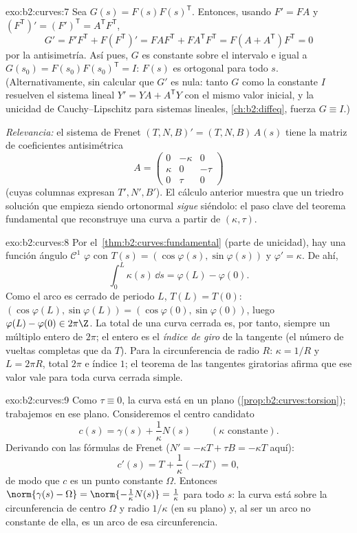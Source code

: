 \begin{solution}{exo:b2:curves:7}
Sea $G(s) = F(s)F(s)^{\mathsf T}$. Entonces, usando $F' = FA$ y
$(F^{\mathsf T})' = (F')^{\mathsf T} = A^{\mathsf T}F^{\mathsf T}$,
\[
G' = F'F^{\mathsf T} + F(F^{\mathsf T})'
= FAF^{\mathsf T} + FA^{\mathsf T}F^{\mathsf T}
= F(A + A^{\mathsf T})F^{\mathsf T} = 0
\]
por la antisimetría. Así pues, $G$ es constante sobre el intervalo e
igual a $G(s_0) = F(s_0)F(s_0)^{\mathsf T} = I$: $F(s)$ es ortogonal
para todo $s$. (Alternativamente, sin calcular que $G'$ es nula:
tanto $G$ como la constante $I$ resuelven el sistema lineal $Y' = YA
+ A^{\mathsf T}Y$ con el mismo valor inicial, y la unicidad de
Cauchy--Lipschitz para sistemas lineales, \cref{ch:b2:diffeq},
fuerza $G \equiv I$.)

\emph{Relevancia:} el sistema de Frenet $(T, N, B)' = (T, N,
B)\,A(s)$ tiene la matriz de coeficientes antisimétrica
\[
A = \begin{pmatrix} 0 & -\kappa & 0\\ \kappa & 0 & -\tau\\
0 & \tau & 0\end{pmatrix}
\]
(cuyas columnas expresan $T', N', B'$). El cálculo anterior muestra
que un triedro solución que empieza siendo ortonormal \emph{sigue}
siéndolo: el paso clave del teorema fundamental que reconstruye una
curva a partir de $(\kappa, \tau)$.
\end{solution}

\begin{solution}{exo:b2:curves:8}
Por el~\cref{thm:b2:curves:fundamental} (parte de unicidad), hay una
función ángulo $\mathcal{C}^1$ $\varphi$ con $T(s) =
(\cos\varphi(s), \sin\varphi(s))$ y $\varphi' = \kappa$. De ahí,
\[
\int_0^L \kappa(s)\,\dd s = \varphi(L) - \varphi(0) .
\]
Como el arco es cerrado de periodo $L$, $T(L) = T(0)$:
$(\cos\varphi(L), \sin\varphi(L)) = (\cos\varphi(0),
\sin\varphi(0))$, luego $\varphi(L) - \varphi(0) \in 2\pi\Z$. La
 total de una curva cerrada es, por tanto, siempre un
múltiplo entero de $2\pi$; el entero es el \emph{índice de giro} de
la tangente (el número de vueltas completas que da $T$). Para la
circunferencia de radio $R$: $\kappa = 1/R$ y $L = 2\pi R$,
 total $2\pi$ e índice $1$; el teorema de las tangentes
giratorias afirma que ese valor vale para toda curva cerrada simple.
\end{solution}

\begin{solution}{exo:b2:curves:9}
Como $\tau \equiv 0$, la curva está en un plano
(\cref{prop:b2:curves:torsion}); trabajemos en ese plano.
Consideremos el centro candidato
\[
c(s) = \gamma(s) + \frac{1}{\kappa}N(s)
\qquad (\kappa \text{ constante}).
\]
Derivando con las fórmulas de Frenet ($N' = -\kappa T + \tau B =
-\kappa T$ aquí):
\[
c'(s) = T + \frac1\kappa(-\kappa T) = 0 ,
\]
de modo que $c$ es un punto constante $\Omega$. Entonces
$\norm{\gamma(s) - \Omega} = \norm{-\frac1\kappa N(s)} =
\frac1\kappa$ para todo $s$: la curva está sobre la circunferencia
de centro $\Omega$ y radio $1/\kappa$ (en su plano) y, al ser un arco
no constante de ella, es un arco de esa circunferencia.
\end{solution}

